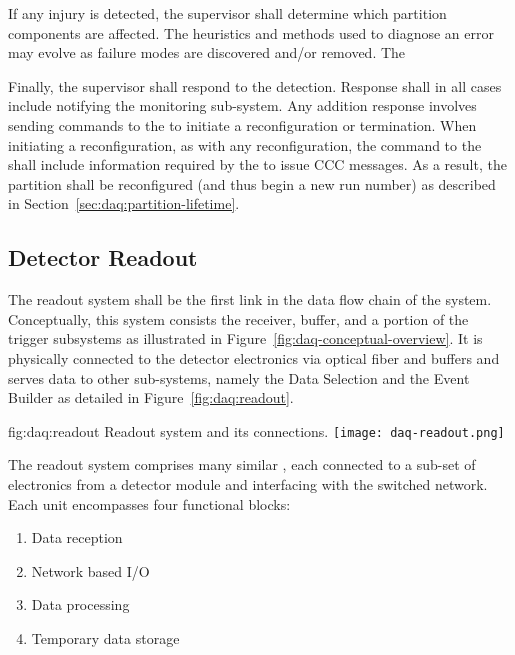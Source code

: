 If any injury is detected, the supervisor shall determine which partition components are affected.  The heuristics and methods used to diagnose an error may evolve as failure modes are discovered and/or removed.  The 

Finally, the supervisor shall respond to the detection. 
Response shall in all cases include notifying the monitoring sub-system. 
Any addition response involves sending commands to the  to initiate a reconfiguration or termination. 
When initiating a reconfiguration, as with any reconfiguration, the command to the  shall include information required by the  to issue CCC messages. 
As a result, the partition shall be reconfigured (and thus begin a new run number) as described in Section~\ref{sec:daq:partition-lifetime}.


\subsection{Detector Readout}
\label{sec:fd-daq:readout}

The readout system shall be the first  link in the data flow chain of the  system.
Conceptually, this system consists the receiver, buffer, and a portion of the trigger subsystems as illustrated in Figure~\ref{fig:daq-conceptual-overview}.
It is physically connected to the detector electronics via optical fiber and buffers and serves data to other  sub-systems, namely the Data Selection and the Event Builder as detailed in Figure~\ref{fig:daq:readout}.

\begin{dunefigure}{fig:daq:readout}{  Readout system and its connections.}
  \texttt{[image: daq-readout.png]}
\end{dunefigure}

The readout system comprises many similar , each connected to a sub-set of electronics from a detector module and interfacing with the  switched network.  Each unit encompasses four functional blocks:

\begin{enumerate}
\item Data reception
\item Network based I/O
\item Data processing
\item Temporary data storage
\end{enumerate}

